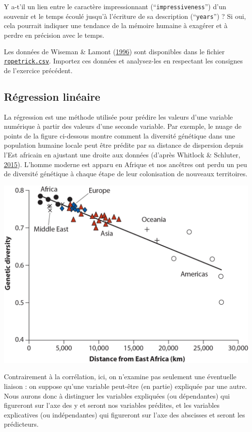 \documentclass[a4paperpaper,]{article}
\begin{document}
Y a-t'il un lien entre le caractère impressionnant (``\texttt{impressiveness}'') d'un souvenir et le temps écoulé jusqu'à l'écriture de sa description (``\texttt{years}'') ? Si oui, cela pourrait indiquer une tendance de la mémoire humaine à exagérer et à perdre en précision avec le temps.

Les données de Wiseman \& Lamont (\protect\hyperlink{ref-wiseman1996}{1996}) sont disponibles dans le fichier \href{https://besibo.github.io/Biometrie3/data/ropetrick.csv}{\texttt{ropetrick.csv}}. Importez ces données et analysez-les en respectant les consignes de l'exercice précédent.

\hypertarget{ruxe9gression-linuxe9aire}{%
\subsection{Régression linéaire}\label{ruxe9gression-linuxe9aire}}

La régression est une méthode utilisée pour prédire les valeurs d'une variable numérique à partir des valeurs d'une seconde variable. Par exemple, le nuage de points de la figure ci-dessous montre comment la diversité génétique dans une population humaine locale peut être prédite par sa distance de dispersion depuis l'Est africain en ajustant une droite aux données (d'après Whitlock \& Schluter, \protect\hyperlink{ref-whitlock2015}{2015}). L'homme moderne est apparu en Afrique et nos ancêtres ont perdu un peu de diversité génétique à chaque étape de leur colonisation de nouveaux territoires.

\includegraphics{images/genetics.jpg}

Contrairement à la corrélation, ici, on n'examine pas seulement une éventuelle liaison : on suppose qu'une variable peut-être (en partie) expliquée par une autre. Nous aurons donc à distinguer les variables expliquées (ou dépendantes) qui figureront sur l'axe des y et seront nos variables prédites, et les variables explicatives (ou indépendantes) qui figureront sur l'axe des abscisses et seront les prédicteurs.
\end{document}
